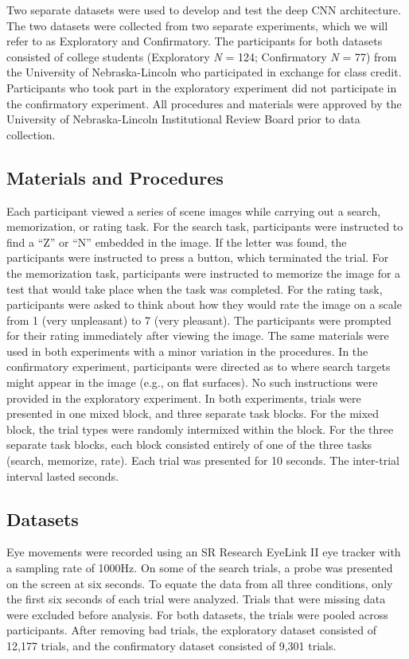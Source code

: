 \documentclass[
  english,
  man,floatsintext]{apa6}
\begin{document}
Two separate datasets were used to develop and test the deep CNN architecture. The two datasets were collected from two separate experiments, which we will refer to as Exploratory and Confirmatory. The participants for both datasets consisted of college students (Exploratory \emph{N} = 124; Confirmatory \emph{N} = 77) from the University of Nebraska-Lincoln who participated in exchange for class credit. Participants who took part in the exploratory experiment did not participate in the confirmatory experiment. All procedures and materials were approved by the University of Nebraska-Lincoln Institutional Review Board prior to data collection.

\subsection{Materials and Procedures}

Each participant viewed a series of scene images while carrying out a search, memorization, or rating task. For the search task, participants were instructed to find a \enquote{Z} or \enquote{N} embedded in the image. If the letter was found, the participants were instructed to press a button, which terminated the trial. For the memorization task, participants were instructed to memorize the image for a test that would take place when the task was completed. For the rating task, participants were asked to think about how they would rate the image on a scale from 1 (very unpleasant) to 7 (very pleasant). The participants were prompted for their rating immediately after viewing the image. The same materials were used in both experiments with a minor variation in the procedures. In the confirmatory experiment, participants were directed as to where search targets might appear in the image (e.g., on flat surfaces). No such instructions were provided in the exploratory experiment. In both experiments, trials were presented in one mixed block, and three separate task blocks. For the mixed block, the trial types were randomly intermixed within the block. For the three separate task blocks, each block consisted entirely of one of the three tasks (search, memorize, rate). Each trial was presented for 10 seconds. The inter-trial interval lasted seconds.

\subsection{Datasets}

Eye movements were recorded using an SR Research EyeLink II eye tracker with a sampling rate of 1000Hz. On some of the search trials, a probe was presented on the screen at six seconds. To equate the data from all three conditions, only the first six seconds of each trial were analyzed. Trials that were missing data were excluded before analysis. For both datasets, the trials were pooled across participants. After removing bad trials, the exploratory dataset consisted of 12,177 trials, and the confirmatory dataset consisted of 9,301 trials.
\end{document}
